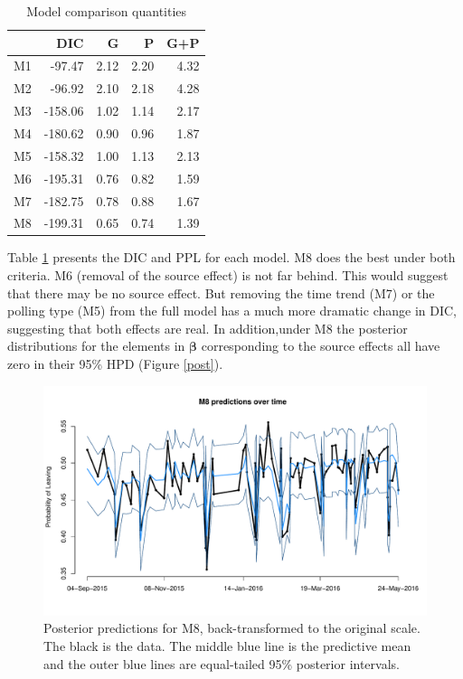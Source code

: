 \documentclass{asaproc}
\newcommand{\m}[1]{\mathbf{\bm{#1}}}
\begin{document}
\begin{table}
\caption{Model comparison quantities}
\centering
\begin{tabular}{lrrrr}
\\ [-5pt]
\hline\hline
   & DIC     & G    & P    & G+P  \\ \hline
M1 &  -97.47 & 2.12 & 2.20 & 4.32 \\
M2 &  -96.92 & 2.10 & 2.18 & 4.28 \\
M3 & -158.06 & 1.02 & 1.14 & 2.17 \\
M4 & -180.62 & 0.90 & 0.96 & 1.87 \\
M5 & -158.32 & 1.00 & 1.13 & 2.13 \\
M6 & -195.31 & 0.76 & 0.82 & 1.59 \\
M7 & -182.75 & 0.78 & 0.88 & 1.67 \\
M8 & -199.31 & 0.65 & 0.74 & 1.39 \\ \hline\hline
\end{tabular}
\label{dic}
\end{table}

Table \ref{dic} presents the DIC and PPL for each model. M8 does the best under both criteria. M6 (removal of the source effect) is not far behind. This would suggest that there may be no source effect. But removing the time trend (M7) or the polling type (M5) from the full model has a much more dramatic change in DIC, suggesting that both effects are real. In addition,under M8 the posterior distributions for the elements in $\m{\beta}$ corresponding to the source effects all have zero in their 95\% HPD (Figure \ref{post}).

\begin{figure}
\centering
\includegraphics[scale=0.51]{figs/pred_time.pdf}
\caption{Posterior predictions for M8, back-transformed to the original scale. The black is the data. The middle blue line is the predictive mean and the outer blue lines are equal-tailed 95\% posterior intervals.}
\label{pred_time}
\end{figure}
\end{document}
